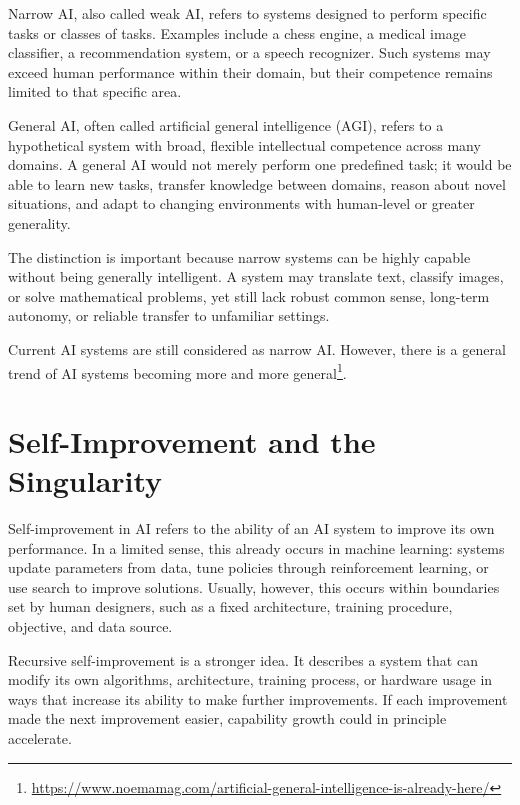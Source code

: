 \documentclass[11pt,openany,oneside]{book}
\begin{document}
Narrow AI, also called weak AI, refers to systems designed to perform specific
tasks or classes of tasks. Examples include a chess engine, a medical image
classifier, a recommendation system, or a speech recognizer. Such systems may exceed human performance
within their domain, but their competence remains limited to that specific area.

General AI, often called artificial general intelligence (AGI), refers to a
hypothetical system with broad, flexible intellectual competence across many
domains. A general AI would not merely perform one predefined task; it would be
able to learn new tasks, transfer knowledge between domains, reason about novel
situations, and adapt to changing environments with human-level or greater
generality.

The distinction is important because narrow systems can be highly capable
without being generally intelligent. A system may translate text, classify
images, or solve mathematical problems, yet still lack robust common sense,
long-term autonomy, or reliable transfer to unfamiliar settings. 


Current AI systems are still considered as narrow AI. However, there is a general trend of AI systems becoming more and more general\footnote{\url{https://www.noemamag.com/artificial-general-intelligence-is-already-here/}}.


\section{Self-Improvement and the Singularity}

Self-improvement in AI refers to the ability of an AI system to improve its own
performance. In a limited sense, this already occurs in machine learning:
systems update parameters from data, tune policies through reinforcement
learning, or use search to improve solutions. Usually, however, this occurs
within boundaries set by human designers, such as a fixed architecture,
training procedure, objective, and data source.

Recursive self-improvement is a stronger idea. It describes a system that can
modify its own algorithms, architecture, training process, or hardware usage in
ways that increase its ability to make further improvements. If each improvement
made the next improvement easier, capability growth could in principle
accelerate.
\end{document}
